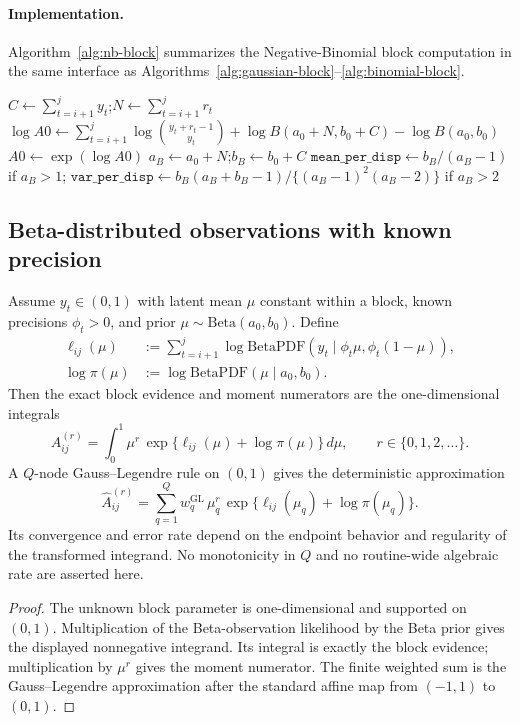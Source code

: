 \paragraph{Implementation.}
Algorithm~\ref{alg:nb-block} summarizes the Negative-Binomial block computation in the same
interface as Algorithms~\ref{alg:gaussian-block}--\ref{alg:binomial-block}.

\begin{algorithm}[H]
\caption{NegBinBlock$(y,r,i,j,a_0,b_0)$}
\label{alg:nb-block}
\KwIn{Block $(i,j]$; counts $y_{i+1:j}$; dispersion $r$ (possibly per-$t$)}
$C\leftarrow\sum_{t=i+1}^j y_t$;\quad $N\leftarrow\sum_{t=i+1}^j r_t$\;
$\log A0\leftarrow \sum_{t=i+1}^j \log\binom{y_t+r_t-1}{y_t} + \log B(a_0+N, b_0+C) - \log B(a_0,b_0)$\;
$A0\leftarrow\exp(\log A0)$\;
$a_B\leftarrow a_0+N$;\quad $b_B\leftarrow b_0+C$\;
$\texttt{mean\_per\_disp}\leftarrow b_B/(a_B-1)$ if $a_B>1$;\quad
$\texttt{var\_per\_disp}\leftarrow b_B(a_B+b_B-1)/\{(a_B-1)^2(a_B-2)\}$ if $a_B>2$\;
\end{algorithm}

\subsection{Beta-distributed observations with known precision}
\label{sec:family-beta}

\begin{proposition}
\label{prop:beta-block}
Assume $y_t\in(0,1)$ with latent mean $\mu$ constant within a block, known precisions
$\phi_t>0$, and prior $\mu\sim\mathrm{Beta}(a_0,b_0)$. Define
\[
\begin{aligned}
\ell_{ij}(\mu)
&:= \sum_{t=i+1}^j
   \log\mathrm{BetaPDF}\!\left(y_t\mid\phi_t\mu,\phi_t(1-\mu)\right),\\
\log\pi(\mu)
&:= \log\mathrm{BetaPDF}(\mu\mid a_0,b_0).
\end{aligned}
\]
Then the exact block evidence and moment numerators are the one-dimensional integrals
\[
A^{(r)}_{ij}
= \int_0^1 \mu^r\,\exp\!\big\{\ell_{ij}(\mu)+\log\pi(\mu)\big\}\,d\mu,
\qquad r\in\{0,1,2,\dots\}.
\]
A $Q$-node Gauss--Legendre rule on $(0,1)$ gives the deterministic approximation
\[
\widehat A^{(r)}_{ij}
= \sum_{q=1}^Q w_q^{\mathrm{GL}}\,\mu_q^r\,\exp\{\ell_{ij}(\mu_q)+\log\pi(\mu_q)\}.
\]
Its convergence and error rate depend on the endpoint behavior and regularity of the transformed
integrand. No monotonicity in $Q$ and no routine-wide algebraic rate are asserted here.
\end{proposition}
\begin{proof}
The unknown block parameter is one-dimensional and supported on $(0,1)$. Multiplication of the
Beta-observation likelihood by the Beta prior gives the displayed nonnegative integrand. Its
integral is exactly the block evidence; multiplication by $\mu^r$ gives the moment numerator. The
finite weighted sum is the Gauss--Legendre approximation after the standard affine map from
$(-1,1)$ to $(0,1)$.
\end{proof}

